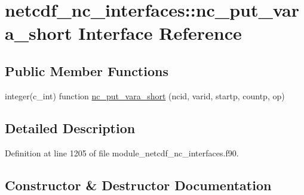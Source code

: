 \hypertarget{interfacenetcdf__nc__interfaces_1_1nc__put__vara__short}{}\section{netcdf\+\_\+nc\+\_\+interfaces\+:\+:nc\+\_\+put\+\_\+vara\+\_\+short Interface Reference}
\label{interfacenetcdf__nc__interfaces_1_1nc__put__vara__short}
\subsection*{Public Member Functions}
\begin{DoxyCompactItemize}
\item 
integer(c\+\_\+int) function \hyperlink{interfacenetcdf__nc__interfaces_1_1nc__put__vara__short_a03bdd86ae57b36a3df72131c557ba157}{nc\+\_\+put\+\_\+vara\+\_\+short} (ncid, varid, startp, countp, op)
\end{DoxyCompactItemize}


\subsection{Detailed Description}


Definition at line 1205 of file module\+\_\+netcdf\+\_\+nc\+\_\+interfaces.\+f90.



\subsection{Constructor \& Destructor Documentation}
\mbox{\label{interfacenetcdf__nc__interfaces_1_1nc__put__vara__short_a03bdd86ae57b36a3df72131c557ba157}} 
